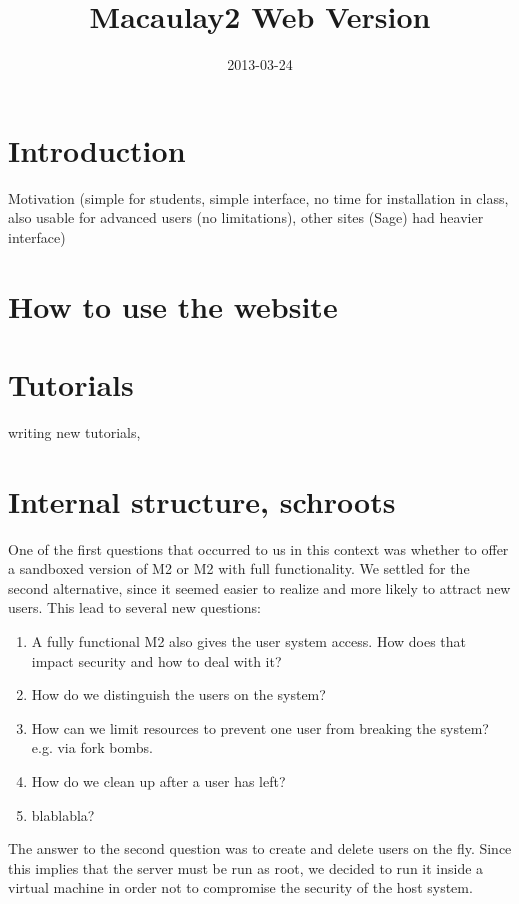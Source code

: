 \documentclass[]{article}
\title{Macaulay2 Web Version}
\author{  }
\date{2013-03-24}
\begin{document}
\ifpdf
{}
\else
{}
\fi

\maketitle


\begin{abstract}
\end{abstract}

\section{Introduction}
Motivation (simple for students, simple interface, no time for installation in class, also usable for advanced users (no limitations), other sites (Sage) had heavier interface)
\section{How to use the website}
\section{Tutorials}
writing new tutorials,
\section{Internal structure, schroots}

One of the first questions that occurred to us in this context was whether to offer a sandboxed version of M2 or M2 with full functionality.
We settled for the second alternative, since it seemed easier to realize and more likely to attract new users.
This lead to several new questions:
\begin{enumerate}
\item A fully functional M2 also gives the user system access. How does that impact security and how to deal with it?
\item How do we distinguish the users on the system?
\item How can we limit resources to prevent one user from breaking the system? e.g. via fork bombs.
\item How do we clean up after a user has left?
\item blablabla?
\end{enumerate}

The answer to the second question was to create and delete users on the fly. Since this implies that the server must be run as root, we decided to run it inside a virtual machine in order not to compromise the security of the host system.
\end{document}

